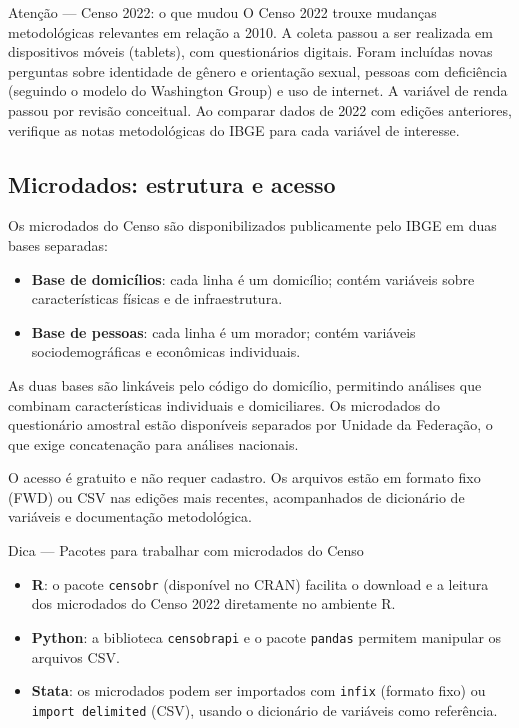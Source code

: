 \begin{boxatencao}{Atenção --- Censo 2022: o que mudou}
O Censo 2022 trouxe mudanças metodológicas relevantes em relação a 2010. A coleta passou a ser realizada em dispositivos móveis (tablets), com questionários digitais. Foram incluídas novas perguntas sobre identidade de gênero e orientação sexual, pessoas com deficiência (seguindo o modelo do Washington Group) e uso de internet. A variável de renda passou por revisão conceitual. Ao comparar dados de 2022 com edições anteriores, verifique as notas metodológicas do IBGE para cada variável de interesse.
\end{boxatencao}

\subsection{Microdados: estrutura e acesso}

Os microdados do Censo são disponibilizados publicamente pelo IBGE em duas bases separadas:

\begin{itemize}
  \item \textbf{Base de domicílios}: cada linha é um domicílio; contém variáveis sobre características físicas e de infraestrutura.
  \item \textbf{Base de pessoas}: cada linha é um morador; contém variáveis sociodemográficas e econômicas individuais.
\end{itemize}

As duas bases são linkáveis pelo código do domicílio, permitindo análises que combinam características individuais e domiciliares. Os microdados do questionário amostral estão disponíveis separados por Unidade da Federação, o que exige concatenação para análises nacionais.

O acesso é gratuito e não requer cadastro. Os arquivos estão em formato fixo (FWD) ou CSV nas edições mais recentes, acompanhados de dicionário de variáveis e documentação metodológica.

\begin{boxdica}{Dica --- Pacotes para trabalhar com microdados do Censo}
\begin{itemize}
  \item \textbf{R}: o pacote \texttt{censobr} (disponível no CRAN) facilita o download e a leitura dos microdados do Censo 2022 diretamente no ambiente R.
  \item \textbf{Python}: a biblioteca \texttt{censobrapi} e o pacote \texttt{pandas} permitem manipular os arquivos CSV.
  \item \textbf{Stata}: os microdados podem ser importados com \texttt{infix} (formato fixo) ou \texttt{import delimited} (CSV), usando o dicionário de variáveis como referência.
\end{itemize}
\end{boxdica}

